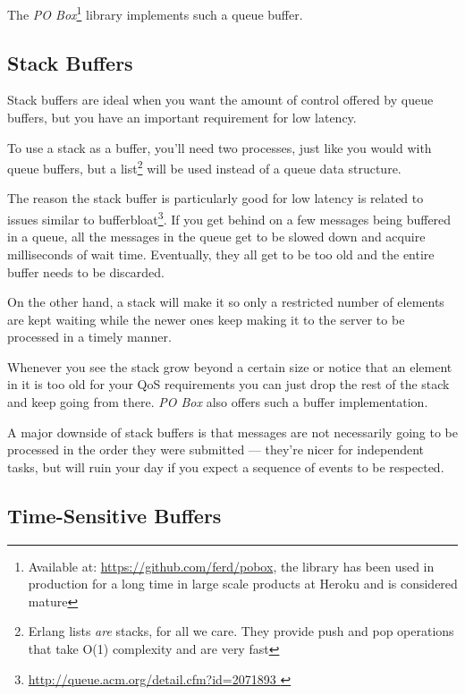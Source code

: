 The \emph{PO Box}\footnote{Available at: \href{https://github.com/ferd/pobox}{https://github.com/ferd/pobox}, the library has been used in production for a long time in large scale products at Heroku and is considered mature} library implements such a queue buffer.

\subsection{Stack Buffers}

Stack buffers are ideal when you want the amount of control offered by queue buffers, but you have an important requirement for low latency.

To use a stack as a buffer, you'll need two processes, just like you would with queue buffers, but a list\footnote{Erlang lists \emph{are} stacks, for all we care. They provide push and pop operations that take O(1) complexity and are very fast} will be used instead of a queue data structure.

The reason the stack buffer is particularly good for low latency is related to issues similar to bufferbloat\footnote{\href{http://queue.acm.org/detail.cfm?id=2071893}{http://queue.acm.org/detail.cfm?id=2071893 }}. If you get behind on a few messages being buffered in a queue, all the messages in the queue get to be slowed down and acquire milliseconds of wait time. Eventually, they all get to be too old and the entire buffer needs to be discarded.


On the other hand, a stack will make it so only a restricted number of elements are kept waiting while the newer ones keep making it to the server to be processed in a timely manner.


Whenever you see the stack grow beyond a certain size or notice that an element in it is too old for your QoS requirements you can just drop the rest of the stack and keep going from there. \emph{PO Box} also offers such a buffer implementation.

A major downside of stack buffers is that messages are not necessarily going to be processed in the order they were submitted — they're nicer for independent tasks, but will ruin your day if you expect a sequence of events to be respected.

\subsection{Time-Sensitive Buffers}


